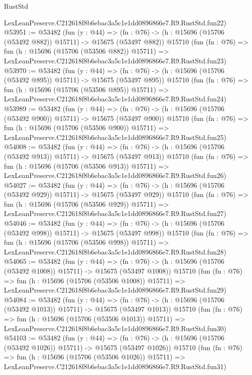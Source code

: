 \begin{lexlean}{RustStd}
\begin{coremodule}
    LexLeanPreserve.C212618f8b6ebac3a5c1e1dd0896866e7.R9.RustStd.fun22)
@53951 := @53482
    (fun (y : @44) =>
    (fn : @76) -> (h : @15696 (@15706 (@53492 @882)) @15711) -> @15675 (@53497 @882))
    @15710
    (fun (fn : @76) =>
    fun (h : @15696 (@15706 (@53506 @882)) @15711) =>
    LexLeanPreserve.C212618f8b6ebac3a5c1e1dd0896866e7.R9.RustStd.fun23)
@53970 := @53482
    (fun (y : @44) =>
    (fn : @76) -> (h : @15696 (@15706 (@53492 @895)) @15711) -> @15675 (@53497 @895))
    @15710
    (fun (fn : @76) =>
    fun (h : @15696 (@15706 (@53506 @895)) @15711) =>
    LexLeanPreserve.C212618f8b6ebac3a5c1e1dd0896866e7.R9.RustStd.fun24)
@53989 := @53482
    (fun (y : @44) =>
    (fn : @76) -> (h : @15696 (@15706 (@53492 @900)) @15711) -> @15675 (@53497 @900))
    @15710
    (fun (fn : @76) =>
    fun (h : @15696 (@15706 (@53506 @900)) @15711) =>
    LexLeanPreserve.C212618f8b6ebac3a5c1e1dd0896866e7.R9.RustStd.fun25)
@54008 := @53482
    (fun (y : @44) =>
    (fn : @76) -> (h : @15696 (@15706 (@53492 @913)) @15711) -> @15675 (@53497 @913))
    @15710
    (fun (fn : @76) =>
    fun (h : @15696 (@15706 (@53506 @913)) @15711) =>
    LexLeanPreserve.C212618f8b6ebac3a5c1e1dd0896866e7.R9.RustStd.fun26)
@54027 := @53482
    (fun (y : @44) =>
    (fn : @76) -> (h : @15696 (@15706 (@53492 @929)) @15711) -> @15675 (@53497 @929))
    @15710
    (fun (fn : @76) =>
    fun (h : @15696 (@15706 (@53506 @929)) @15711) =>
    LexLeanPreserve.C212618f8b6ebac3a5c1e1dd0896866e7.R9.RustStd.fun27)
@54046 := @53482
    (fun (y : @44) =>
    (fn : @76) -> (h : @15696 (@15706 (@53492 @998)) @15711) -> @15675 (@53497 @998))
    @15710
    (fun (fn : @76) =>
    fun (h : @15696 (@15706 (@53506 @998)) @15711) =>
    LexLeanPreserve.C212618f8b6ebac3a5c1e1dd0896866e7.R9.RustStd.fun28)
@54065 := @53482
    (fun (y : @44) =>
    (fn : @76) -> (h : @15696 (@15706 (@53492 @1008)) @15711) -> @15675 (@53497 @1008))
    @15710
    (fun (fn : @76) =>
    fun (h : @15696 (@15706 (@53506 @1008)) @15711) =>
    LexLeanPreserve.C212618f8b6ebac3a5c1e1dd0896866e7.R9.RustStd.fun29)
@54084 := @53482
    (fun (y : @44) =>
    (fn : @76) -> (h : @15696 (@15706 (@53492 @1013)) @15711) -> @15675 (@53497 @1013))
    @15710
    (fun (fn : @76) =>
    fun (h : @15696 (@15706 (@53506 @1013)) @15711) =>
    LexLeanPreserve.C212618f8b6ebac3a5c1e1dd0896866e7.R9.RustStd.fun30)
@54103 := @53482
    (fun (y : @44) =>
    (fn : @76) -> (h : @15696 (@15706 (@53492 @1026)) @15711) -> @15675 (@53497 @1026))
    @15710
    (fun (fn : @76) =>
    fun (h : @15696 (@15706 (@53506 @1026)) @15711) =>
    LexLeanPreserve.C212618f8b6ebac3a5c1e1dd0896866e7.R9.RustStd.fun31)

\end{coremodule}
\end{lexlean}
